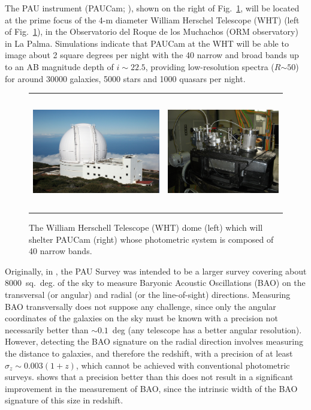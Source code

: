 The PAU instrument (PAUCam; \citet{Castander2012}), shown on the right of Fig.~\ref{fig:pau_survey}, will be located at the prime focus of the 4-m diameter William Herschel Telescope (WHT) (left of Fig.~\ref{fig:pau_survey}), in the Observatorio del Roque de los Muchachos (ORM observatory) in La Palma. Simulations indicate that PAUCam at the WHT will be able to image about 2 square degrees per night with the 40 narrow and broad bands up to an AB magnitude depth of $i\sim22.5$, providing low-resolution spectra ($R$$\sim50$) for around 30000 galaxies, 5000 stars and 1000 quasars per night.
\begin{figure}
\centering
\begin{tabular}{rl}
\includegraphics[height=50mm]{./plots/pau_telescope.jpg} & \includegraphics[height=50mm]{./plots/paucam.jpg}
\end{tabular}
\caption{The William Herschell Telescope (WHT) dome (left) which will shelter PAUCam (right) whose photometric system is composed of 40 narrow bands.}
\label{fig:pau_survey}
\end{figure}

Originally, in \citet{Benitez2009}, the PAU Survey was intended to be a larger survey covering about 8000~sq.~deg. of the sky to measure Baryonic Acoustic Oscillations (BAO) on the transversal (or angular) and radial (or the line-of-sight) directions. Measuring BAO transversally does not suppose any challenge, since only the angular coordinates of the galaxies on the sky must be known with a precision not necessarily better than $\sim0.1$~deg (any telescope has a better angular resolution). However, detecting the BAO signature on the radial direction involves measuring the distance to galaxies, and therefore the redshift, with a precision of at least $\sigma_z \sim 0.003(1+z)$, which cannot be achieved with conventional photometric surveys. \citet{Benitez2009} shows that a precision better than this does not result in a significant improvement in the measurement of BAO, since the intrinsic width of the BAO signature of this size in redshift.

